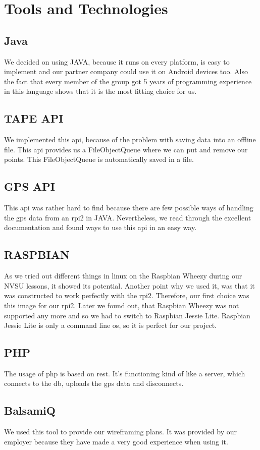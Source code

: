 \chapter{Tools and Technologies}
\section{Java}
We decided on using JAVA, because it runs on every platform, is easy to implement and our partner company could use it on Android devices too. Also the fact that every member of the group got 5 years of programming experience in this language shows that it is the most fitting choice for us.
\section{TAPE API}
We implemented this \gls{api}, because of the problem with saving data into an offline file. This \gls{api} provides us a FileObjectQueue where we can put and remove our points. This FileObjectQueue is automatically saved in a file.
\section{GPS API}
This \gls{api} was rather hard to find because there are few possible ways of handling the \gls{gps} data from an \gls{rpi2} in JAVA. Nevertheless, we read through the excellent documentation and found ways to use this \gls{api} in an easy way.
\section{RASPBIAN}
As we tried out different things in linux on the Raspbian Wheezy during our NVSU lessons, it showed its potential. Another point why we used it, was that it was constructed to work perfectly with the \gls{rpi2}. Therefore, our first choice was this image for our \gls{rpi2}. Later we found out, that Raspbian Wheezy was not supported any more and so we had to switch to Raspbian Jessie Lite. Raspbian Jessie Lite is only a command line \gls{os}, so it is perfect for our project.
\section{PHP}
The usage of \gls{php} is based on \gls{rest}. It's functioning kind of like a server, which connects to the \gls{db}, uploads the \gls{gps} data and disconnects.
\section{BalsamiQ}
We used this tool to provide our wireframing plans. It was provided by our employer because they have made a very good experience when using it.
